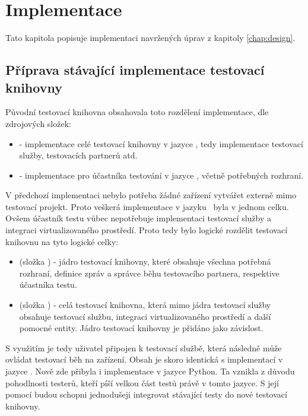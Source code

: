 \chapter{Implementace}\label{chap:implementation}

Tato kapitola popisuje implementaci navržených úprav z kapitoly \ref{chap:design}.


\section{Příprava stávající implementace testovací knihovny}
Původní testovací knihovna obsahovala toto rozdělení implementace, dle zdrojových složek:

\begin{itemize}
    \item {} - implementace celé testovací knihovny v jazyce \csharp, tedy implementace testovací služby, testovacích partnerů atd.
    \item {} - implementace pro účastníka testování v jazyce \cpp, včetně potřebných rozhraní.
\end{itemize}

V předchozí implementaci nebylo potřeba žádné zařízení vytvářet externě mimo testovací projekt. Proto veškerá implementace v jazyku \csharp\, byla v jednom celku. Ovšem účastník testu vůbec nepotřebuje implementaci testovací služby a integraci virtualizovaného prostředí. Proto tedy bylo logické rozdělit testovací knihovnu na tyto logické celky:

\begin{itemize}
    \item {} (složka ) - jádro testovací knihovny, které obsahuje všechna potřebná rozhraní, definice zpráv a správce běhu testovacího partnera, respektive účastníka testu.
    \item {} (složka ) - celá testovací knihovna, která mimo jádra testovací služby obsahuje testovací službu, integraci virtualizovaného prostředí a další pomocné entity. Jádro testovací knihovny je přidáno jako závislost. 
\end{itemize}

S využitím  je tedy uživatel připojen k testovací službě, která následně může ovládat testovací běh na zařízení. Obsah je skoro identická s implementací v jazyce \cpp. Nově zde přibyla i implementace v jazyce Python. Ta vznikla z důvodu pohodlnosti testerů, kteří píší velkou část testů právě v tomto jazyce. S její pomocí budou schopni jednodušeji integrovat stávající testy do nové testovací knihovny. 

